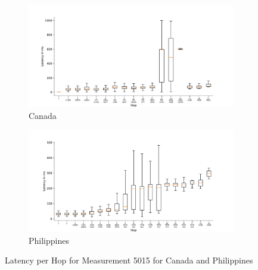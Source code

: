 \begin{figure}
	\centering
	\begin{subfigure}[b]{\linewidth}
		\includegraphics[width=\linewidth]{chapters/4-results/traceroute/img/latency-per-hop-CA-5015.pdf}
		\caption{Canada}
	\end{subfigure}
	\begin{subfigure}[b]{\linewidth}
		\includegraphics[width=\linewidth]{chapters/4-results/traceroute/img/latency-per-hop-PH-5015.pdf}
		\caption{Philippines}
	\end{subfigure}
	\caption{Latency per Hop for Measurement 5015 for Canada and
		Philippines}
	\label{fig:latency-change-per-hop-appendix-15}
\end{figure}

